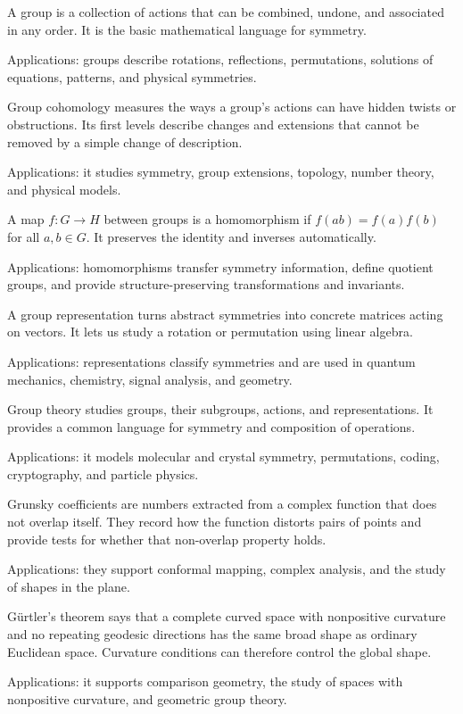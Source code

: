 A group is a collection of actions that can be combined, undone, and associated in any order. It is the basic mathematical language for symmetry. \par\noindent Applications: groups describe rotations, reflections, permutations, solutions of equations, patterns, and physical symmetries.

Group cohomology measures the ways a group's actions can have hidden twists or obstructions. Its first levels describe changes and extensions that cannot be removed by a simple change of description. \par\noindent Applications: it studies symmetry, group extensions, topology, number theory, and physical models.

A map $f:G\to H$ between groups is a homomorphism if $f(ab)=f(a)f(b)$ for all $a,b\in G$. It preserves the identity and inverses automatically. \par\noindent Applications: homomorphisms transfer symmetry information, define quotient groups, and provide structure-preserving transformations and invariants.

A group representation turns abstract symmetries into concrete matrices acting on vectors. It lets us study a rotation or permutation using linear algebra. \par\noindent Applications: representations classify symmetries and are used in quantum mechanics, chemistry, signal analysis, and geometry.

Group theory studies groups, their subgroups, actions, and representations. It provides a common language for symmetry and composition of operations. \par\noindent Applications: it models molecular and crystal symmetry, permutations, coding, cryptography, and particle physics.

Grunsky coefficients are numbers extracted from a complex function that does not overlap itself. They record how the function distorts pairs of points and provide tests for whether that non-overlap property holds. \par\noindent Applications: they support conformal mapping, complex analysis, and the study of shapes in the plane.

Gürtler's theorem says that a complete curved space with nonpositive curvature and no repeating geodesic directions has the same broad shape as ordinary Euclidean space. Curvature conditions can therefore control the global shape. \par\noindent Applications: it supports comparison geometry, the study of spaces with nonpositive curvature, and geometric group theory.

